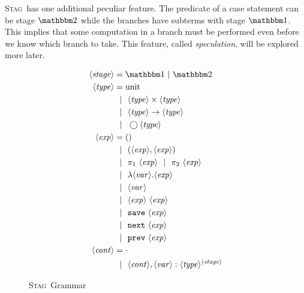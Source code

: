 \documentclass[11pt]{article}
\newcommand {\stage} {\langle\mathit{stage}\rangle}
\newcommand {\type} {\langle\mathit{type}\rangle}
\newcommand {\expr} {\langle\mathit{exp}\rangle}
\newcommand {\var} {\langle\mathit{var}\rangle}
\newcommand {\context} {\langle\mathit{cont}\rangle}
\newcommand {\gbar} {~~|~~}
\newcommand {\fut} {\bigcirc}
\newcommand {\bbone} {\mathbbm 1}
\newcommand {\bbtwo} {\mathbbm 2}
\newcommand {\pause} {{\tt save}}
\newcommand {\next} {{\tt next}}
\newcommand {\prev} {{\tt prev}}
\newcommand {\wstage} {\textsc{Stag}}
\begin{document}
\wstage~has one additional peculiar feature.  The predicate of a case statement can be stage $\bbtwo$ while the branches have subterms with stage $\bbone$.  This implies that some computation in a branch must be performed even before we know which branch to take.  This feature, called {\it speculation}, will be explored more later.

\begin{figure}
\caption{\wstage~Grammar}
\label{fig:gram}
\centering
\begin{align*}
\stage &= \bbone~|~\bbtwo \\
\type &= \text{unit} \\
&\gbar \type \times \type \\
&\gbar \type \to \type \\
&\gbar \fut \type \\
\expr &= () \\
&\gbar (\expr, \expr) \\
&\gbar \pi_1~\expr \gbar \pi_2~\expr \\
&\gbar \lambda \var.\expr \\
&\gbar \var \\
&\gbar \expr~\expr \\
&\gbar \pause~\expr \\
&\gbar \next~\expr \\
&\gbar \prev~\expr \\
\context &= \cdot \\
&\gbar \context, \var : \type ^{\stage}
\end{align*}
\end{figure}
\end{document}
